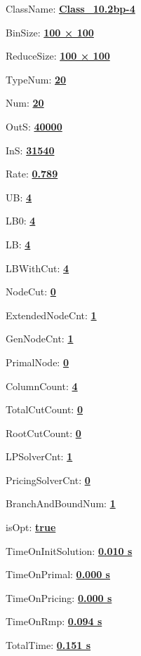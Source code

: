 \documentclass[11pt]{article}
\begin{document}
\pagestyle{empty}


ClassName: \underline{\textbf{Class_10.2bp-4}}
\par
BinSize: \underline{\textbf{100 × 100}}
\par
ReduceSize: \underline{\textbf{100 × 100}}
\par
TypeNum: \underline{\textbf{20}}
\par
Num: \underline{\textbf{20}}
\par
OutS: \underline{\textbf{40000}}
\par
InS: \underline{\textbf{31540}}
\par
Rate: \underline{\textbf{0.789}}
\par
UB: \underline{\textbf{4}}
\par
LB0: \underline{\textbf{4}}
\par
LB: \underline{\textbf{4}}
\par
LBWithCut: \underline{\textbf{4}}
\par
NodeCut: \underline{\textbf{0}}
\par
ExtendedNodeCnt: \underline{\textbf{1}}
\par
GenNodeCnt: \underline{\textbf{1}}
\par
PrimalNode: \underline{\textbf{0}}
\par
ColumnCount: \underline{\textbf{4}}
\par
TotalCutCount: \underline{\textbf{0}}
\par
RootCutCount: \underline{\textbf{0}}
\par
LPSolverCnt: \underline{\textbf{1}}
\par
PricingSolverCnt: \underline{\textbf{0}}
\par
BranchAndBoundNum: \underline{\textbf{1}}
\par
isOpt: \underline{\textbf{true}}
\par
TimeOnInitSolution: \underline{\textbf{0.010 s}}
\par
TimeOnPrimal: \underline{\textbf{0.000 s}}
\par
TimeOnPricing: \underline{\textbf{0.000 s}}
\par
TimeOnRmp: \underline{\textbf{0.094 s}}
\par
TotalTime: \underline{\textbf{0.151 s}}
\par
\newpage


\end{document}
